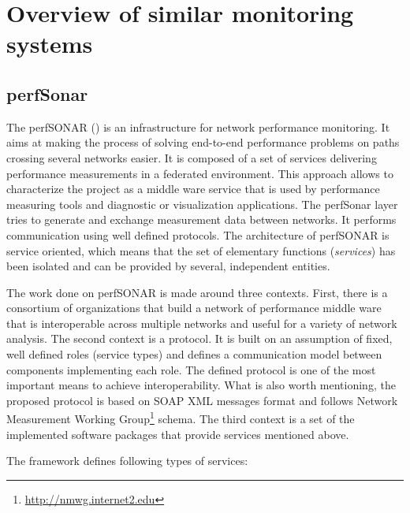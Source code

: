 
\section{Overview of similar monitoring systems} \label{sec:ch2_similar}


\subsection{perfSonar}

The perfSONAR (\cite{perfSonar1,perfSonar2,perfSonar3}) is an infrastructure for network performance monitoring. It aims at making the process of solving end-to-end performance problems on paths crossing several networks easier. It is composed of a set of services delivering performance measurements in a federated environment. This approach allows to characterize the project as a middle ware service that is used by performance measuring tools and diagnostic or visualization applications. The perfSonar layer tries to generate and exchange measurement data between networks. It performs communication using well defined protocols. The architecture of perfSONAR is service oriented, which means that the set of elementary functions (\emph{services}) has been isolated and can be provided by several, independent entities.

The work done on perfSONAR is made around three contexts. First, there is a consortium of organizations that build a network of performance middle ware that is interoperable across multiple networks and useful for a variety of network analysis. The second context is a protocol. It is built on an assumption of fixed, well defined roles (service types) and defines a communication model between components implementing each role. The defined protocol is one of the most important means to achieve interoperability. What is also worth mentioning, the proposed protocol is based on SOAP XML messages format and follows Network Measurement Working Group\footnote{\url{http://nmwg.internet2.edu}} schema. The third context is a set of the implemented software packages that provide services mentioned above.

The framework defines following types of services:

